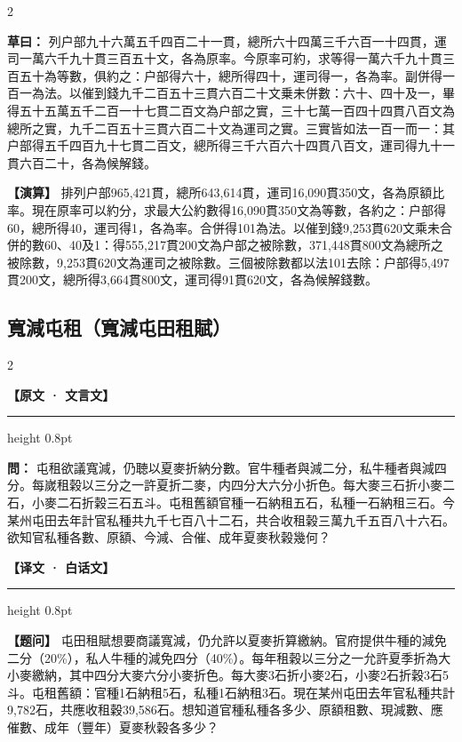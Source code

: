 \documentclass[11pt,a4paper]{article}
\newcommand{\ClassicalQuestion}[1]{\par\noindent\textbf{\color{problemcolor}問：}#1\par}
\newcommand{\ClassicalWorking}[1]{\par\noindent\textbf{草曰：}#1\par}
\newcommand{\ModernQuestion}[1]{\par\noindent\textbf{\color{modernlabel}【题问】}#1\par}
\newcommand{\ModernWorking}[1]{\par\noindent\textbf{【演算】}#1\par}
\newcommand{\ClassicalHeader}{%
  \begin{center}\textbf{\color{headerclassical}【原文 · 文言文】}\end{center}
  \vspace{-0.5em}
  \hrule height 0.8pt
  \vspace{0.5em}
}
\newcommand{\ModernHeader}{%
  \begin{center}\textbf{\color{headermodern}【译文 · 白话文】}\end{center}
  \vspace{-0.5em}
  \hrule height 0.8pt
  \vspace{0.5em}
}
\begin{document}
\begin{paracol}{2}

\ClassicalWorking{%
列户部九十六萬五千四百二十一貫，總所六十四萬三千六百一十四貫，運司一萬六千九十貫三百五十文，各為原率。今原率可約，求等得一萬六千九十貫三百五十為等數，俱約之：户部得六十，總所得四十，運司得一，各為率。副併得一百一為法。以催到錢九千二百五十三貫六百二十文乗未併數：六十、四十及一，畢得五十五萬五千二百一十七貫二百文為户部之實，三十七萬一百四十四貫八百文為總所之實，九千二百五十三貫六百二十文為運司之實。三實皆如法一百一而一：其户部得五千四百九十七貫二百文，總所得三千六百六十四貫八百文，運司得九十一貫六百二十，各為候解錢。}

\switchcolumn

\ModernWorking{%
排列户部965,421貫，總所643,614貫，運司16,090貫350文，各為原額比率。現在原率可以約分，求最大公約數得16,090貫350文為等數，各約之：户部得60，總所得40，運司得1，各為率。合併得101為法。以催到錢9,253貫620文乘未合併的數60、40及1：得555,217貫200文為户部之被除數，371,448貫800文為總所之被除數，9,253貫620文為運司之被除數。三個被除數都以法101去除：户部得5,497貫200文，總所得3,664貫800文，運司得91貫620文，各為候解錢數。
}

\end{paracol}

\newpage
\subsection*{\color{sectioncolor}寬減屯租（寬減屯田租賦）}

\begin{paracol}{2}

\ClassicalHeader

\ClassicalQuestion{%
屯租欲議寬減，仍聴以夏麥折納分數。官牛種者與減二分，私牛種者與減四分。每嵗租榖以三分之一許夏折二麥，内四分大六分小折色。每大麥三石折小麥二石，小麥二石折榖三石五斗。屯租舊額官種一石納租五石，私種一石納租三石。今某州屯田去年計官私種共九千七百八十二石，共合收租榖三萬九千五百八十六石。欲知官私種各數、原額、今減、合催、成年夏麥秋榖幾何？}

\switchcolumn

\ModernHeader

\ModernQuestion{%
屯田租賦想要商議寬減，仍允許以夏麥折算繳納。官府提供牛種的減免二分（20\%），私人牛種的減免四分（40\%）。每年租穀以三分之一允許夏季折為大小麥繳納，其中四分大麥六分小麥折色。每大麥3石折小麥2石，小麥2石折穀3石5斗。屯租舊額：官種1石納租5石，私種1石納租3石。現在某州屯田去年官私種共計9,782石，共應收租穀39,586石。想知道官種私種各多少、原額租數、現減數、應催數、成年（豐年）夏麥秋穀各多少？
}

\end{paracol}
\end{document}

